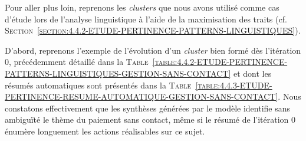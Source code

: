 			Pour aller plus loin, reprenons les \textit{clusters} que nous avons utilisé comme cas d'étude lors de l'analyse linguistique à l'aide de la maximisation des traits (cf. \textsc{Section~\ref{section:4.4.2-ETUDE-PERTINENCE-PATTERNS-LINGUISTIQUES}}).
			
			D'abord, reprenons l'exemple de l'évolution d'un \textit{cluster} bien formé dès l'itération $0$, précédemment détaillé dans la \textsc{Table~\ref{table:4.4.2-ETUDE-PERTINENCE-PATTERNS-LINGUISTIQUES-GESTION-SANS-CONTACT}} et dont les résumés automatiques sont présentés dans la \textsc{Table~\ref{table:4.4.3-ETUDE-PERTINENCE-RESUME-AUTOMATIQUE-GESTION-SANS-CONTACT}}.
			Nous constatons effectivement que les synthèses générées par le modèle identifie sans ambiguïté le thème du paiement sans contact, même si le résumé de l'itération $0$ énumère longuement les actions réalisables sur ce sujet.
			
